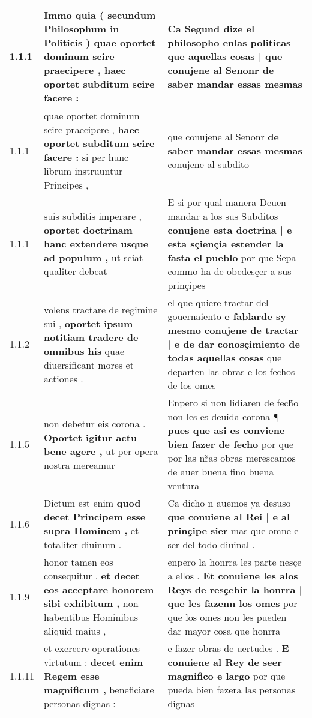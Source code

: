 \begin{tabular}{|p{1cm}|p{6.5cm}|p{6.5cm}|}

\hline
1.1.1 & Immo quia ( secundum Philosophum in Politicis ) \textbf{ quae oportet dominum scire praecipere , } haec oportet subditum scire facere : & Ca Segund dize el philosopho enlas politicas \textbf{ que aquellas cosas | que conujene al Senonr } de saber mandar essas mesmas \\\hline
1.1.1 & quae oportet dominum scire praecipere , \textbf{ haec oportet subditum scire facere : } si per hunc librum instruuntur Principes , & que conujene al Senonr \textbf{ de saber mandar essas mesmas } conujene al subdito \\\hline
1.1.1 & suis subditis imperare , \textbf{ oportet doctrinam hanc extendere usque ad populum , } ut sciat qualiter debeat & E si por qual manera Deuen mandar a los sus Subditos \textbf{ conujene esta doctrina | e esta sçiençia estender la fasta el pueblo } por que Sepa commo ha de obedesçer a sus prinçipes \\\hline
1.1.2 & volens tractare de regimine sui , \textbf{ oportet ipsum notitiam tradere de omnibus his } quae diuersificant mores et actiones . & el que quiere tractar del gouernaiento \textbf{ e fablarde sy mesmo conujene de tractar | e de dar conosçimiento de todas aquellas cosas } que departen las obras e los fechos de los omes \\\hline
1.1.5 & non debetur eis corona . \textbf{ Oportet igitur actu bene agere , } ut per opera nostra mereamur & Enpero si non lidiaren de fech̃o non les es deuida corona ¶ \textbf{ pues que asi es conviene bien fazer de fecho } por que por las nr̃as obras merescamos de auer buena fino buena ventura \\\hline
1.1.6 & Dictum est enim \textbf{ quod decet Principem esse supra Hominem , } et totaliter diuinum . & Ca dicho n auemos ya desuso \textbf{ que conuiene al Rei | e al prinçipe sier } mas que omne e ser del todo diuinal . \\\hline
1.1.9 & honor tamen eos consequitur , \textbf{ et decet eos acceptare honorem sibi exhibitum , } non habentibus Hominibus aliquid maius , & enpero la honrra les parte nesçe a ellos . \textbf{ Et conuiene les alos Reys de resçebir la honrra | que les fazenn los omes } por que los omes non les pueden dar mayor cosa que honrra \\\hline
1.1.11 & et exercere operationes virtutum : \textbf{ decet enim Regem esse magnificum , } beneficiare personas dignas : & e fazer obras de uertudes . \textbf{ E conuiene al Rey de seer magnifico e largo } por que pueda bien fazera las personas dignas \\\hline

\end{tabular}
